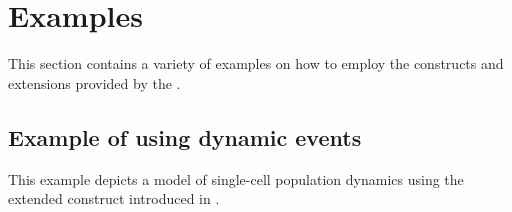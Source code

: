 %
\section{Examples}
\label{sec:examples}

This section contains a variety of examples on how to employ the constructs and extensions provided by the \sbmlthreedynamic.

\subsection{Example of using dynamic events}

This example depicts a model of single-cell population dynamics using the extended \Event construct introduced in .

